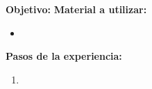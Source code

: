 \documentclass{article}
\title{}
\author{Matias Mazzanti }
\date{}
\begin{document}
\maketitle


\section{}



\vspace{0.3cm}
\textbf{Objetivo:}
\vspace{0.3cm}
\textbf{Material a utilizar:}
\begin{itemize}
  \item
\end{itemize}
\vspace{0.3cm}
\textbf{Pasos de la experiencia:}
\vspace{0.3cm}
\begin{enumerate}
  \item
\end{enumerate}
\end{document}
